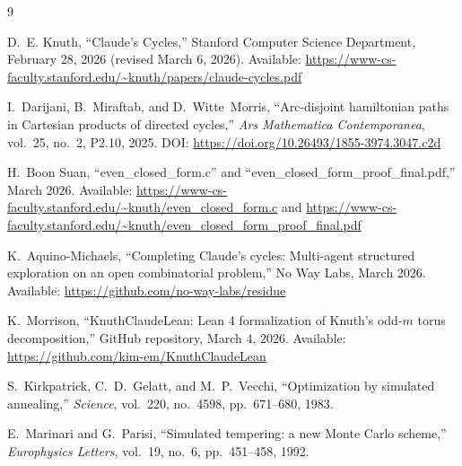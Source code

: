 \documentclass[11pt]{article}
\theoremstyle{plain}
\begin{document}
\begin{thebibliography}{9}

D.~E. Knuth, ``Claude's Cycles,'' Stanford Computer Science Department,
February 28, 2026 (revised March 6, 2026).
Available: \url{https://www-cs-faculty.stanford.edu/~knuth/papers/claude-cycles.pdf}

I.~Darijani, B.~Miraftab, and D.~Witte~Morris, ``Arc-disjoint hamiltonian
paths in Cartesian products of directed cycles,'' \emph{Ars Mathematica
Contemporanea}, vol.~25, no.~2, P2.10, 2025.
DOI: \url{https://doi.org/10.26493/1855-3974.3047.c2d}

H.~Boon Suan, ``even\_closed\_form.c'' and
``even\_closed\_form\_proof\_final.pdf,'' March 2026.
Available: \url{https://www-cs-faculty.stanford.edu/~knuth/even_closed_form.c}
and \url{https://www-cs-faculty.stanford.edu/~knuth/even_closed_form_proof_final.pdf}

K.~Aquino-Michaels, ``Completing Claude's cycles: Multi-agent structured
exploration on an open combinatorial problem,'' No Way Labs, March 2026.
Available: \url{https://github.com/no-way-labs/residue}

K.~Morrison, ``KnuthClaudeLean: Lean 4 formalization of Knuth's odd-$m$
torus decomposition,'' GitHub repository, March 4, 2026.
Available: \url{https://github.com/kim-em/KnuthClaudeLean}

S.~Kirkpatrick, C.~D.~Gelatt, and M.~P.~Vecchi, ``Optimization by simulated
annealing,'' \emph{Science}, vol.~220, no.~4598, pp.~671--680, 1983.

E.~Marinari and G.~Parisi, ``Simulated tempering: a new Monte Carlo scheme,''
\emph{Europhysics Letters}, vol.~19, no.~6, pp.~451--458, 1992.

\end{thebibliography}
\end{document}
